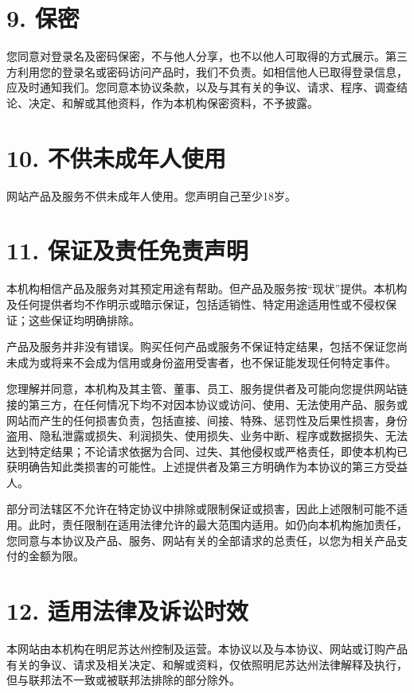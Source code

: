 \documentclass[UTF8,fontset=none,11pt,a4paper]{ctexart}
\begin{document}
\section*{9. 保密}
您同意对登录名及密码保密，不与他人分享，也不以他人可取得的方式展示。第三方利用您的登录名或密码访问产品时，我们不负责。如相信他人已取得登录信息，应及时通知我们。您同意本协议条款，以及与其有关的争议、请求、程序、调查结论、决定、和解或其他资料，作为本机构保密资料，\allowbreak\mbox{不予披露。}


\section*{10. 不供未成年人使用}
网站产品及服务不供未成年人使用。您声明自己至少18岁。


\section*{11. 保证及责任免责声明}
本机构相信产品及服务对其预定用途有帮助。但产品及服务按“现状”提供。本机构及任何提供者均不作明示或暗示保证，包括适销性、特定用途适用性或不侵权保证；这些保证均\allowbreak\mbox{明确排除。}


产品及服务并非没有错误。购买任何产品或服务不保证特定结果，包括不保证您尚未成为或将来不会成为信用或身份盗用受害者，也不保证能发现任何\allowbreak\mbox{特定事件。}


您理解并同意，本机构及其主管、董事、员工、服务提供者及可能向您提供网站链接的第三方，在任何情况下均不对因本协议或访问、使用、无法使用产品、服务或网站而产生的任何损害负责，包括直接、间接、特殊、惩罚性及后果性损害，身份盗用、隐私泄露或损失、利润损失、使用损失、业务中断、程序或数据损失、无法达到特定结果；不论请求依据为合同、过失、其他侵权或严格责任，即使本机构已获明确告知此类损害的可能性。上述提供者及第三方明确作为本协议的第三\allowbreak\mbox{方受益人。}


部分司法辖区不允许在特定协议中排除或限制保证或损害，因此上述限制可能不适用。此时，责任限制在适用法律允许的最大范围内适用。如仍向本机构施加责任，您同意与本协议及产品、服务、网站有关的全部请求的总责任，以您为相关产品支付的\allowbreak\mbox{金额为限。}


\section*{12. 适用法律及诉讼时效}
本网站由本机构在明尼苏达州控制及运营。本协议以及与本协议、网站或订购产品有关的争议、请求及相关决定、和解或资料，仅依照明尼苏达州法律解释及执行，但与联邦法不一致或被联邦法排除的\allowbreak\mbox{部分除外。}
\end{document}

